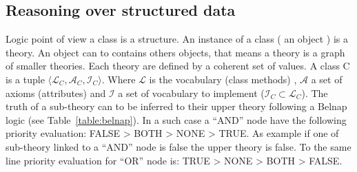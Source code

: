 \documentclass{llncs}
\begin{document}
\subsection{Reasoning over structured data}
Logic point of view a class is a structure. An instance of a class ( an object ) is a theory. An object can to contains others objects, that means a theory is a graph of smaller theories. Each theory are defined by a coherent set of values. A class C is a tuple \( \langle \mathcal{L}_{C}, \mathcal{A}_{C} , \mathcal{I}_{C} \rangle \). Where  \(\mathcal{L} \) is the vocabulary (class methods) ,  \(\mathcal{A} \)  a set of axioms (attributes) and \(\mathcal{I} \) a set of vocabulary to implement (\( \mathcal{I}_{C} \subset\mathcal{L}_{C} \)). The truth of a sub-theory can to be inferred to their upper theory following a Belnap logic (see Table~\ref{table:belnap}). In a such case a ``AND'' node have the following priority evaluation: FALSE > BOTH > NONE > TRUE. As example if one of sub-theory linked to a ``AND'' node is false the upper theory is false. To the same line priority evaluation for ``OR'' node is: TRUE > NONE > BOTH > FALSE.
    
\end{document}
